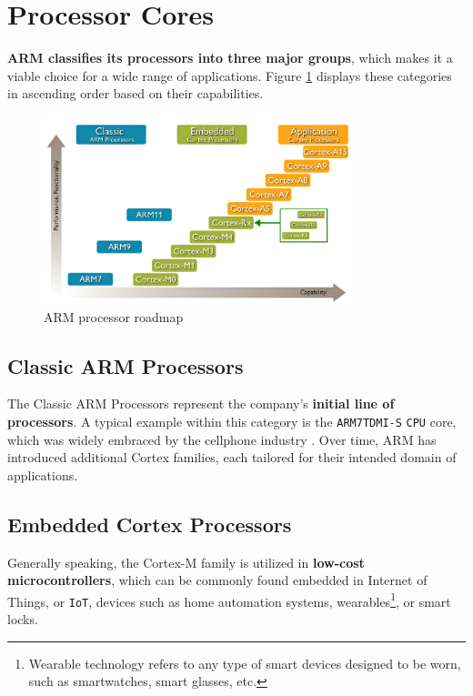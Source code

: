 \documentclass[english, ing, kiv, he, iso690numb, pdf]{fasthesis}
\begin{document}
	\section{Processor Cores}
	
	\textbf{ARM classifies its processors into three major groups}, which makes it a viable choice for a wide range of applications. Figure \ref{ARM processor roadmap} displays these categories in ascending order based on their capabilities.
	
	\begin{figure}[ht]
		\centering
		\includegraphics[width=0.8\textwidth]{img/diagrams/arm_processor_roadmap.jpeg}
		\caption{ARM processor roadmap}
		\label{ARM processor roadmap}
	\end{figure}
	
	\subsection{Classic ARM Processors}
	
	The Classic ARM Processors represent the company's \textbf{initial line of processors}. A typical example within this category is the \texttt{ARM7TDMI-S} \texttt{CPU} core, which was widely embraced by the cellphone industry \cite{ARM-mobile}. Over time, ARM has introduced additional Cortex families, each tailored for their intended domain of applications.
	
	\subsection{Embedded Cortex Processors}
	
	Generally speaking, the Cortex-M family is utilized in \textbf{low-cost microcontrollers}, which can be commonly found embedded in Internet of Things, or \texttt{IoT}, devices such as home automation systems, wearables\footnote{Wearable technology refers to any type of smart devices designed to be worn, such as smartwatches, smart glasses, etc.}, or smart locks.
	
\end{document}
